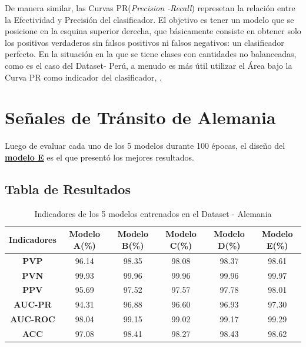 	De manera similar, las Curvas PR(\textit{Precision -Recall}) represetan la relación entre la Efectividad y Precisión del clasificador. El objetivo es tener un modelo que se posicione en la esquina superior derecha, que básicamente consiste en obtener solo los positivos verdaderos sin falsos positivos ni falsos negativos: un clasificador perfecto. En la situación en la que se tiene clases con cantidades no balanceadas, como es el caso del Dataset- Perú, a menudo es más útil utilizar el Área bajo la Curva PR como indicador del clasificador, \citep{Davis-2006-RPR-1143844-1143874}.


		
	\section{Señales de Tránsito de Alemania}
		Luego de evaluar cada uno de los 5 modelos durante 100 épocas, el diseño del \underline{\bf modelo E} es el que presentó los mejores resultados.

		\subsection{Tabla de Resultados}


		\begin{table}[H]
			\begin{center}
			\caption{\small{Indicadores de los 5 modelos entrenados en el Dataset - Alemania}}
			\vspace{1.1em}
			\begin{tabular}{|c|c|c|c|c|c|}
			\cline{1-6}
			\textbf{Indicadores}    & \textbf{Modelo A(\%)} & \textbf{Modelo B(\%)} & \textbf{Modelo C(\%)} &\textbf{ Modelo D(\%)} & \textbf{Modelo E(\%)} \\ \hline
			\multicolumn{1}{|c|}{\textbf{PVP}}        & 96.14     & 98.35       & 98.08       & 98.37       & 98.61       \\ \hline
			\multicolumn{1}{|c|}{\textbf{PVN}}        & 99.93     & 99.96       & 99.96       & 99.96       & 99.97       \\ \hline
			\multicolumn{1}{|c|}{\textbf{PPV}}        & 95.69     & 97.52       & 97.57       & 97.78       & 98.01      \\ \hline
			\multicolumn{1}{|c|}{\textbf{AUC-PR}}     & 94.31     & 96.88       & 96.60       & 96.93       & 97.30       \\ \hline
			\multicolumn{1}{|c|}{\textbf{AUC-ROC}}    & 98.04     & 99.15       & 99.02       & 99.17       & 99.29       \\ \hline
			\multicolumn{1}{|c|}{\textbf{ACC}}        & 97.08     & 98.41       & 98.27       & 98.43       & 98.62       \\ \hline
			\end{tabular}
			\end{center}
		\end{table}

